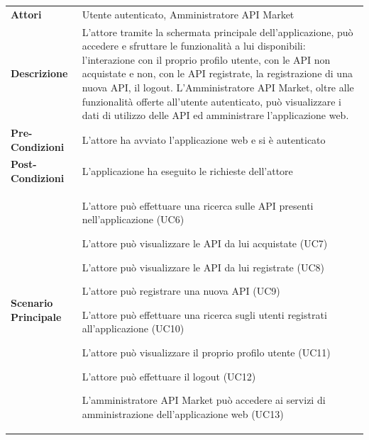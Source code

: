 \begin{longtable}{ l | p{11cm}}
	\hline
	\rowcolor{Gray}
	 \multicolumn{2}{c}{UC2 - Main post-autenticazione} \\
	 \hline
	\textbf{Attori} & Utente autenticato, Amministratore API Market \\
	\textbf{Descrizione} & L'attore tramite la schermata principale
	dell'applicazione, può accedere e sfruttare le funzionalità a lui disponibili: l'interazione
	con il proprio profilo utente, con le API non acquistate e non, con le API registrate, la
	registrazione di una nuova API, il logout. 
	L'Amministratore API Market, oltre alle funzionalità offerte all'utente autenticato, può
	visualizzare i dati di utilizzo delle API ed amministrare l'applicazione web.  \\
	\textbf{Pre-Condizioni} & L'attore ha avviato l'applicazione web e si è autenticato \\
	\textbf{Post-Condizioni} & L'applicazione ha eseguito le richieste dell'attore \\
	\textbf{Scenario Principale} & 
	\begin{enumerate*}[label=(\arabic*.),itemjoin={\newline}]
		\item L'attore può effettuare una ricerca sulle API presenti nell'applicazione
(UC6)
		\item L'attore può visualizzare le API da lui acquistate (UC7)
		\item L'attore può visualizzare le API da lui registrate (UC8)
		\item L'attore può registrare una nuova API (UC9)
		\item L'attore può effettuare una ricerca sugli utenti registrati all'applicazione (UC10)
		\item L'attore può visualizzare il proprio profilo utente (UC11)
		\item L'attore può effettuare il logout (UC12)
		\item L'amministratore API Market può accedere ai servizi di amministrazione dell'applicazione web (UC13)
	\end{enumerate*}\\
\end{longtable}